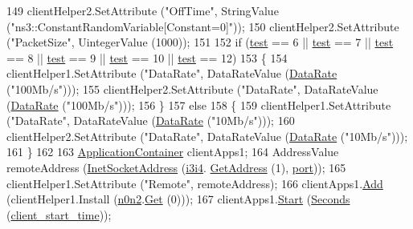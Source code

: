 \begin{DoxyCode}
149   clientHelper2.SetAttribute (\textcolor{stringliteral}{"OffTime"}, StringValue (\textcolor{stringliteral}{"ns3::ConstantRandomVariable[Constant=0]"}));
150   clientHelper2.SetAttribute (\textcolor{stringliteral}{"PacketSize"}, UintegerValue (1000));
151 
152   \textcolor{keywordflow}{if} (\hyperlink{main-test-sync_8cc_a708a4c1a4d0c4acc4c447310dd4db27f}{test} == 6 || \hyperlink{main-test-sync_8cc_a708a4c1a4d0c4acc4c447310dd4db27f}{test} == 7 || \hyperlink{main-test-sync_8cc_a708a4c1a4d0c4acc4c447310dd4db27f}{test} == 8 || \hyperlink{main-test-sync_8cc_a708a4c1a4d0c4acc4c447310dd4db27f}{test} == 9 || \hyperlink{main-test-sync_8cc_a708a4c1a4d0c4acc4c447310dd4db27f}{test} == 10 || 
      \hyperlink{main-test-sync_8cc_a708a4c1a4d0c4acc4c447310dd4db27f}{test} == 12)
153     \{
154       clientHelper1.SetAttribute (\textcolor{stringliteral}{"DataRate"}, DataRateValue (\hyperlink{classns3_1_1DataRate}{DataRate} (\textcolor{stringliteral}{"100Mb/s"})));
155       clientHelper2.SetAttribute (\textcolor{stringliteral}{"DataRate"}, DataRateValue (\hyperlink{classns3_1_1DataRate}{DataRate} (\textcolor{stringliteral}{"100Mb/s"})));
156     \}
157   \textcolor{keywordflow}{else}
158     \{
159       clientHelper1.SetAttribute (\textcolor{stringliteral}{"DataRate"}, DataRateValue (\hyperlink{classns3_1_1DataRate}{DataRate} (\textcolor{stringliteral}{"10Mb/s"})));
160       clientHelper2.SetAttribute (\textcolor{stringliteral}{"DataRate"}, DataRateValue (\hyperlink{classns3_1_1DataRate}{DataRate} (\textcolor{stringliteral}{"10Mb/s"})));
161     \}
162 
163   \hyperlink{classns3_1_1ApplicationContainer}{ApplicationContainer} clientApps1;
164   AddressValue remoteAddress (\hyperlink{classns3_1_1InetSocketAddress}{InetSocketAddress} (\hyperlink{adaptive-red-tests_8cc_ae521eb38559954aa9357fa662c3bb76e}{i3i4}.
      \hyperlink{classns3_1_1Ipv4InterfaceContainer_ae63208dcd222be986822937ee4aa828c}{GetAddress} (1), \hyperlink{dsdv-manet_8cc_a8e0798404bf2cf5dabb84c5ba9a4f236}{port}));
165   clientHelper1.SetAttribute (\textcolor{stringliteral}{"Remote"}, remoteAddress);
166   clientApps1.\hyperlink{classns3_1_1ApplicationContainer_ad09ab1a1ad5849d518d5f4c262e38152}{Add} (clientHelper1.Install (\hyperlink{adaptive-red-tests_8cc_aeaa87dbd052b50719525adea0f586b36}{n0n2}.\hyperlink{classns3_1_1NodeContainer_a9ed96e2ecc22e0f5a3d4842eb9bf90bf}{Get} (0)));
167   clientApps1.\hyperlink{classns3_1_1ApplicationContainer_a8eff87926507020bbe3e1390358a54a7}{Start} (\hyperlink{group__timecivil_ga33c34b816f8ff6628e33d5c8e9713b9e}{Seconds} (\hyperlink{adaptive-red-tests_8cc_a18ff86acaf663200fbedb1f77d03b515}{client\_start\_time}));

\end{DoxyCode}
